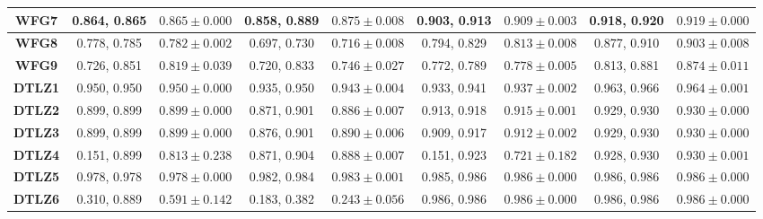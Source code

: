 \begin{table*}[t]
\begin{tabular}{c|c|c|c|c|c|c|c|c|}
\multicolumn{1}{|c|}{\textbf{WFG7}}  & 0.864, 0.865            & $0.865 \pm 0.000$       & 0.858, 0.889            & $0.875 \pm 0.008$       & 0.903, 0.913            & $0.909 \pm 0.003$       & 0.918, 0.920            & $0.919 \pm 0.000$       \\ \hline
\multicolumn{1}{|c|}{\textbf{WFG8}}  & 0.778, 0.785            & $0.782 \pm 0.002$       & 0.697, 0.730            & $0.716 \pm 0.008$       & 0.794, 0.829            & $0.813 \pm 0.008$       & 0.877, 0.910            & $0.903 \pm 0.008$       \\ \hline
\multicolumn{1}{|c|}{\textbf{WFG9}}  & 0.726, 0.851            & $0.819 \pm 0.039$       & 0.720, 0.833            & $0.746 \pm 0.027$       & 0.772, 0.789            & $0.778 \pm 0.005$       & 0.813, 0.881            & $0.874 \pm 0.011$       \\ \hline
\multicolumn{1}{|c|}{\textbf{DTLZ1}} & 0.950, 0.950            & $0.950 \pm 0.000$       & 0.935, 0.950            & $0.943 \pm 0.004$       & 0.933, 0.941            & $0.937 \pm 0.002$       & 0.963, 0.966            & $0.964 \pm 0.001$       \\ \hline
\multicolumn{1}{|c|}{\textbf{DTLZ2}} & 0.899, 0.899            & $0.899 \pm 0.000$       & 0.871, 0.901            & $0.886 \pm 0.007$       & 0.913, 0.918            & $0.915 \pm 0.001$       & 0.929, 0.930            & $0.930 \pm 0.000$       \\ \hline
\multicolumn{1}{|c|}{\textbf{DTLZ3}} & 0.899, 0.899            & $0.899 \pm 0.000$       & 0.876, 0.901            & $0.890 \pm 0.006$       & 0.909, 0.917            & $0.912 \pm 0.002$       & 0.929, 0.930            & $0.930 \pm 0.000$       \\ \hline
\multicolumn{1}{|c|}{\textbf{DTLZ4}} & 0.151, 0.899            & $0.813 \pm 0.238$       & 0.871, 0.904            & $0.888 \pm 0.007$       & 0.151, 0.923            & $0.721 \pm 0.182$       & 0.928, 0.930            & $0.930 \pm 0.001$       \\ \hline
\multicolumn{1}{|c|}{\textbf{DTLZ5}} & 0.978, 0.978            & $0.978 \pm 0.000$       & 0.982, 0.984            & $0.983 \pm 0.001$       & 0.985, 0.986            & $0.986 \pm 0.000$       & 0.986, 0.986            & $0.986 \pm 0.000$       \\ \hline
\multicolumn{1}{|c|}{\textbf{DTLZ6}} & 0.310, 0.889            & $0.591 \pm 0.142$       & 0.183, 0.382            & $0.243 \pm 0.056$       & 0.986, 0.986            & $0.986 \pm 0.000$       & 0.986, 0.986            & $0.986 \pm 0.000$       \\ \hline

\end{tabular}
\end{table*}
